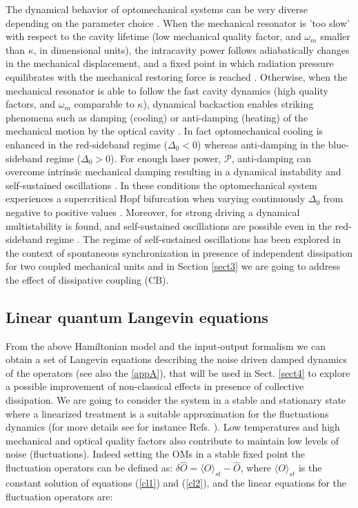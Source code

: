\documentclass[a4paper]{jpconf}
\begin{document}
The dynamical behavior of optomechanical systems can be very diverse depending on the  parameter choice \cite{1}. When the mechanical resonator is 'too slow' with 
respect to the cavity lifetime (low mechanical quality factor, and $\omega_m$ smaller than $\kappa$, in dimensional units), the intracavity power follows adiabatically
changes in the mechanical displacement, and a fixed point in which radiation pressure equilibrates with the mechanical restoring force is reached \cite{2}.
Otherwise, when the mechanical resonator is able to follow the fast cavity dynamics (high quality factors, and $\omega_m$ comparable to $\kappa$),
dynamical backaction
enables striking phenomena such as damping (cooling) or anti-damping (heating) of the mechanical motion by the optical cavity \cite{1,46}. In fact 
optomechanical cooling is enhanced in the red-sideband regime ($\Delta_0<0$) whereas anti-damping in the blue-sideband regime ($\Delta_0>0$). For enough 
laser power, $\mathcal{P}$, anti-damping can overcome intrinsic mechanical damping resulting in a dynamical instability and self-sustained 
oscillations \cite{1,46}. In these conditions the optomechanical system experiences a supercritical Hopf bifurcation when varying continuously $\Delta_0$
from negative to positive values \cite{6,47}. Moreover, for strong driving a dynamical multistability is found,
and self-sustained oscillations are possible even in the red-sideband regime \cite{6}.
The regime of self-sustained oscillations has been explored in the context of spontaneous synchronization 
in presence of independent dissipation for two coupled mechanical units \cite{9}
and in Section \ref{sect3} we are going to address the effect of dissipative coupling (CB).

\subsection{Linear quantum Langevin equations}

From the above Hamiltonian model and the input-output formalism we can obtain a 
set of Langevin equations describing the noise driven damped dynamics of the 
operators \cite{1} (see also the \ref{appA}), that will be used in Sect. \ref{sect4} to explore 
a possible improvement of non-classical effects in presence of collective dissipation.
We are going to consider the system in a stable and stationary state where 
a linearized treatment is a suitable approximation for the fluctuations dynamics
(for more details see for instance Refs. \cite{1,22,48}).
Low temperatures and high mechanical and optical quality 
factors \cite{1} also contribute to maintain low levels of noise (fluctuations). Indeed setting the OMs in a stable fixed point \cite{22,48} the fluctuation 
operators can be defined as:
$\delta\hat{O}= \langle{O}\rangle_{st}-\hat{O}$, where 
$ \langle{O}\rangle_{st}$ is the constant solution of equations (\ref{cl1}) and (\ref{cl2}), and the linear 
equations for the fluctuation operators are:
\end{document}
